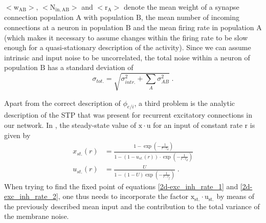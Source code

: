\documentclass[10pt,a4paper]{article}
\begin{document}
$\mathrm{<w_{AB}>,\, <N_{in,AB}>}$ and $\mathrm{<r_A>}$ denote the mean weight of a synapse connection population $\mathrm{A}$ with population $\mathrm{B}$, the mean number of incoming connections at a neuron in population $\mathrm{B}$ and the mean firing rate in population $\mathrm{A}$ (which makes it necessary to assume changes within the firing rate to be slow enough for a quasi-stationary description of the activity).
Since we can assume intrinsic and input noise to be uncorrelated, the total noise within a neuron of population $\mathrm{B}$ has a standard deviation of 
\begin{equation}
\sigma_{tot.} = \sqrt{\sigma_{intr.}^2 + \sum_A \sigma_{AB}^2} \; .
\label{Total_Noise_Neuron}
\end{equation}

Apart from the correct description of $\phi_{e/i}$, a third problem is the analytic description of the STP that was present for recurrent excitatory connections in our network. In \cite{Markram_STP}, the steady-state value of $\mathrm{x\cdot u}$ for an input of constant rate $\mathrm{r}$ is given by
\begin{align}
x_{st.}(r) &= \frac{1-\exp \left(-\frac{1}{r\cdot \tau _d}\right)}{1-\left(1-u_{st.}\left(r\right)\right)\cdot \exp \left(-\frac{1}{r\cdot \tau _d}\right)} \label{STP_steady1} \\
u_{st.}(r) &= \frac{U}{1-\left(1-U\right)\exp \left(-\frac{1}{r\cdot \tau _f}\right)} \; .\label{STP_steady2}
\end{align}
When trying to find the fixed point of equations \ref{2d-exc_inh_rate_1} and \ref{2d-exc_inh_rate_2}, one thus needs to incorporate the factor $\mathrm{x_{st.}\cdot u_{st.}}$ by means of the previously described mean input and the contribution to the total variance of the membrane noise.
 
\end{document}
